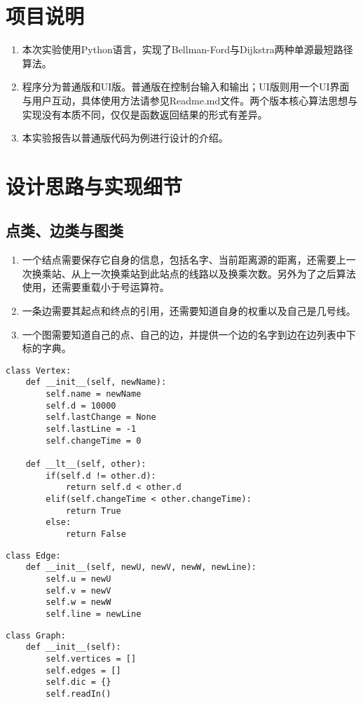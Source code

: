 \documentclass[12pt,letterpaper]{article}
\begin{document}
	\section{项目说明}
\begin{enumerate}
	\item 本次实验使用Python语言，实现了Bellman-Ford与Dijkstra两种单源最短路径算法。
	\item 程序分为普通版和UI版。普通版在控制台输入和输出；UI版则用一个UI界面与用户互动，具体使用方法请参见Readme.md文件。两个版本核心算法思想与实现没有本质不同，仅仅是函数返回结果的形式有差异。
	\item 本实验报告以普通版代码为例进行设计的介绍。
\end{enumerate}	
\section{设计思路与实现细节}
\subsection{点类、边类与图类}
\begin{enumerate}
	\item 一个结点需要保存它自身的信息，包括名字、当前距离源的距离，还需要上一次换乘站、从上一次换乘站到此站点的线路以及换乘次数。另外为了之后算法使用，还需要重载小于号运算符。
	\item 一条边需要其起点和终点的引用，还需要知道自身的权重以及自己是几号线。
	\item 一个图需要知道自己的点、自己的边，并提供一个边的名字到边在边列表中下标的字典。
\end{enumerate}
\begin{lstlisting}[style = Python]
class Vertex:
    def __init__(self, newName):
        self.name = newName
        self.d = 10000
        self.lastChange = None
        self.lastLine = -1
        self.changeTime = 0

    def __lt__(self, other):
        if(self.d != other.d):
            return self.d < other.d
        elif(self.changeTime < other.changeTime):
            return True
        else:
            return False
\end{lstlisting}
\begin{lstlisting}[style = Python]
class Edge:
    def __init__(self, newU, newV, newW, newLine):
        self.u = newU
        self.v = newV
        self.w = newW
        self.line = newLine
\end{lstlisting}
\begin{lstlisting}[style = Python]
class Graph:
    def __init__(self):
        self.vertices = []
        self.edges = []
        self.dic = {}
        self.readIn()
\end{lstlisting}
\end{document}
